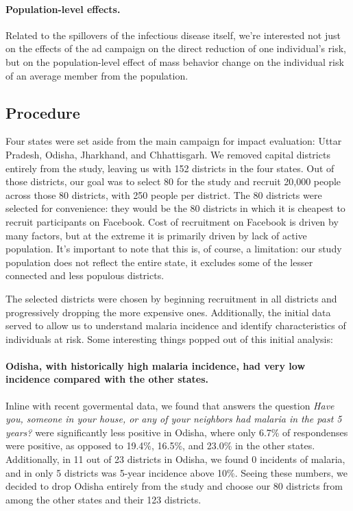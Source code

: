 \documentclass[a4paper,12pt]{article}
\begin{document}
\paragraph{Population-level effects.} Related to the spillovers of the infectious disease itself, we're interested not just on the effects of the ad campaign on the direct reduction of one individual's risk, but on the population-level effect of mass behavior change on the individual risk of an average member from the population.


\subsection{Procedure}

Four states were set aside from the main campaign for impact evaluation: Uttar Pradesh, Odisha, Jharkhand, and Chhattisgarh. We removed capital districts entirely from the study, leaving us with 152 districts in the four states. Out of those districts, our goal was to select 80 for the study and recruit 20,000 people across those 80 districts, with 250 people per district. The 80 districts were selected for convenience: they would be the 80 districts in which it is cheapest to recruit participants on Facebook. Cost of recruitment on Facebook is driven  by many factors, but at the extreme it is primarily driven by lack of active population. It's important to note that this is, of course, a limitation: our study population does not reflect the entire state, it excludes some of the lesser connected and less populous districts.



The selected districts were chosen by beginning recruitment in all districts and progressively dropping the more expensive ones. Additionally, the initial data served to allow us to understand malaria incidence and identify characteristics of individuals at risk. Some interesting things popped out of this initial analysis:

\paragraph{Odisha, with historically high malaria incidence, had very low incidence compared with the other states.} Inline with recent govermental data, we found that answers the question \textit{Have you, someone in your house, or any of your neighbors had malaria in the past 5 years?} were significantly less positive in Odisha, where only 6.7\% of respondenses were positive, as opposed to 19.4\%, 16.5\%, and 23.0\% in the other states. Additionally, in 11 out of 23 districts in Odisha, we found 0 incidents of malaria, and in only 5 districts was 5-year incidence above 10\%. Seeing these numbers, we decided to drop Odisha entirely from the study and choose our 80 districts from among the other states and their 123 districts.
\end{document}
